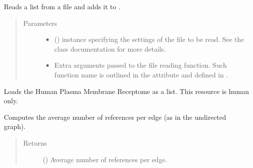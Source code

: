 \documentclass[letterpaper,10pt,english]{sphinxmanual}
\begin{document}
\begin{fulllineitems}
\begin{fulllineitems}
\label{\detokenize{main:pypath.main.PyPath.read_list_file}}
Reads a list from a file and adds it to
.
\begin{quote}\begin{description}
\item[{Parameters}] \leavevmode\begin{itemize}
\item {} 
 () \textendash{}  instance specifying
the settings of the file to be read. See the class
documentation for more details.

\item {} 
 \textendash{} Extra arguments passed to the file reading function. Such
function name is outlined in the
 attribute and
defined in .

\end{itemize}

\end{description}\end{quote}

\end{fulllineitems}


\begin{fulllineitems}
\label{\detokenize{main:pypath.main.PyPath.receptors_list}}
Loads the Human Plasma Membrane Receptome as a list. This
resource is human only.

\end{fulllineitems}


\begin{fulllineitems}
\label{\detokenize{main:pypath.main.PyPath.reference_edge_ratio}}
Computes the average number of references per edge (as in the
undirected graph).
\begin{quote}\begin{description}
\item[{Returns}] \leavevmode
() \textendash{} Average number of references per edge.


\end{description}
\end{quote}
\end{fulllineitems}
\end{fulllineitems}
\end{document}
